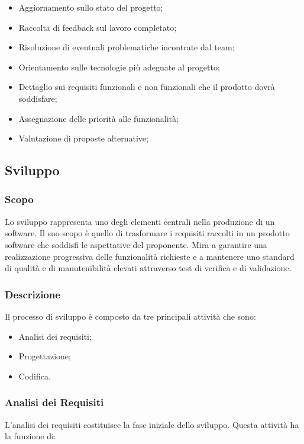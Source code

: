         \begin{itemize}
            \item Aggiornamento sullo stato del progetto;
            \item Raccolta di feedback sul lavoro completato;
            \item Risoluzione di eventuali problematiche incontrate dal team;
            \item Orientamento sulle tecnologie più adeguate al progetto;
            \item Dettaglio sui requisiti funzionali e non funzionali che il prodotto dovrà soddisfare;
            \item Assegnazione delle priorità alle funzionalità;
            \item Valutazione di proposte alternative;
        \end{itemize}

    \subsection{Sviluppo}
        \subsubsection{Scopo}
        Lo sviluppo rappresenta uno degli elementi centrali nella produzione di un software.
        Il suo scopo è quello di trasformare i requisiti raccolti in un 
        prodotto software che soddisfi le aspettative del 
        proponente. Mira a garantire una realizzazione progressiva delle 
        funzionalità richieste e a mantenere uno standard di qualità e di
        manutenibilità elevati attraverso test di verifica e di validazione.

        \subsubsection{Descrizione}
        Il processo di sviluppo è composto da tre principali attività che sono:
        \begin{itemize}
            \item Analisi dei requisiti;
            \item Progettazione;
            \item Codifica.
        \end{itemize}


        \subsubsection{Analisi dei Requisiti}
        L'analisi dei requisiti costituisce la fase iniziale dello sviluppo.
        Questa attività ha la funzione di: 

